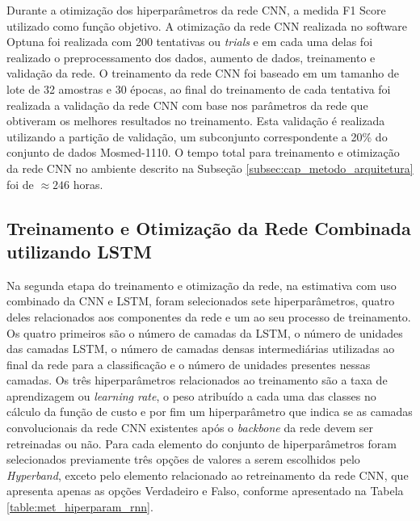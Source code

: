 Durante a otimização dos hiperparâmetros da rede CNN, a medida F1 Score utilizado como função objetivo. A otimização da rede CNN realizada no software Optuna foi realizada com 200 tentativas ou \textit{trials} e em cada uma delas foi realizado o preprocessamento dos dados, aumento de dados, treinamento e validação da rede. O treinamento da rede CNN foi baseado em um tamanho de lote de 32 amostras e 30 épocas, ao final do treinamento de cada tentativa foi realizada a validação da rede CNN com base nos parâmetros da rede que obtiveram os melhores resultados no treinamento. Esta validação é realizada utilizando a partição de validação, um subconjunto correspondente a 20\% do conjunto de dados Mosmed-1110. O tempo total para treinamento e otimização da rede CNN no ambiente descrito na Subseção \ref{subsec:cap_metodo_arquitetura} foi de $\approx 246$ horas.

\subsection{Treinamento e Otimização da Rede Combinada utilizando LSTM}\label{subsec:cap_metodo_treinamento_combinada_lstm}

Na segunda etapa do treinamento e otimização da rede, na estimativa com uso combinado da CNN e LSTM, foram selecionados sete hiperparâmetros, quatro deles relacionados aos componentes da rede e um ao seu processo de treinamento. Os quatro primeiros são o número de camadas da LSTM, o número de unidades das camadas LSTM, o número de camadas densas intermediárias utilizadas ao final da rede para a classificação e o número de unidades presentes nessas camadas. Os três hiperparâmetros relacionados ao treinamento são a taxa de aprendizagem ou \textit{learning rate}, o peso atribuído a cada uma das classes no cálculo da função de custo e por fim um hiperparâmetro que indica se as camadas convolucionais da rede CNN existentes após o \textit{backbone} da rede devem ser retreinadas ou não. Para cada elemento do conjunto de hiperparâmetros foram selecionados previamente três opções de valores a serem escolhidos pelo \textit{Hyperband}, exceto pelo elemento relacionado ao retreinamento da rede CNN, que apresenta apenas as opções Verdadeiro e Falso, conforme apresentado na Tabela \ref{table:met_hiperparam_rnn}.


